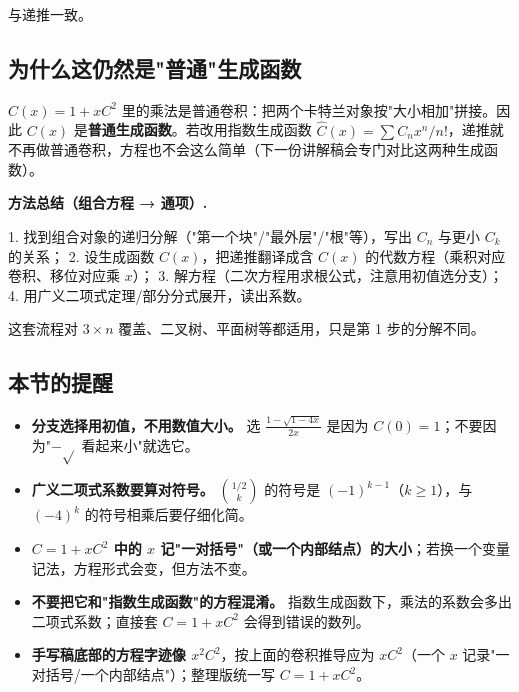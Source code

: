 与递推一致。

\subsection{为什么这仍然是"普通"生成函数}


$C(x)=1+xC^2$ 里的乘法是普通卷积：把两个卡特兰对象按"大小相加"拼接。因此 $C(x)$ 是\textbf{普通生成函数}。若改用指数生成函数 $\hat C(x)=\sum C_nx^n/n!$，递推就不再做普通卷积，方程也不会这么简单（下一份讲解稿会专门对比这两种生成函数）。

\textbf{方法总结（组合方程 → 通项）.}

1. 找到组合对象的递归分解（"第一个块"/"最外层"/"根"等），写出 $C_n$ 与更小 $C_k$ 的关系；
2. 设生成函数 $C(x)$，把递推翻译成含 $C(x)$ 的代数方程（乘积对应卷积、移位对应乘 $x$）；
3. 解方程（二次方程用求根公式，注意用初值选分支）；
4. 用广义二项式定理/部分分式展开，读出系数。

这套流程对 $3\times n$ 覆盖、二叉树、平面树等都适用，只是第 1 步的分解不同。

\subsection{本节的提醒}


\begin{itemize}
\item \textbf{分支选择用初值，不用数值大小。} 选 $\frac{1-\sqrt{1-4x}}{2x}$ 是因为 $C(0)=1$；不要因为"$-\sqrt{}$ 看起来小"就选它。
\item \textbf{广义二项式系数要算对符号。} $\binom{1/2}{k}$ 的符号是 $(-1)^{k-1}$（$k\ge1$），与 $(-4)^k$ 的符号相乘后要仔细化简。
\item \textbf{$C=1+xC^2$ 中的 $x$ 记"一对括号"（或一个内部结点）的大小}；若换一个变量记法，方程形式会变，但方法不变。
\item \textbf{不要把它和"指数生成函数"的方程混淆。} 指数生成函数下，乘法的系数会多出二项式系数；直接套 $C=1+xC^2$ 会得到错误的数列。
\item \textbf{手写稿底部的方程字迹像 $x^2C^2$}，按上面的卷积推导应为 $xC^2$（一个 $x$ 记录"一对括号/一个内部结点"）；整理版统一写 $C=1+xC^2$。
\end{itemize}
